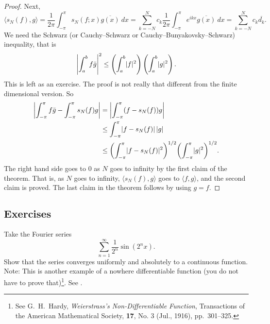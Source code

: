 \begin{proof}
Next,
\begin{equation*}
\langle s_N(f) , g \rangle
=
\frac{1}{2\pi}
\int_{-\pi}^\pi
s_N(f;x) \overline{g(x)} ~ dx
=
\sum_{k=-N}^N
c_k 
\frac{1}{2\pi}
\int_{-\pi}^\pi
e^{ikx}
\overline{g(x)} ~ dx
=
\sum_{k=-N}^N
c_k 
\overline{d_k} .
\end{equation*}
We need the Schwarz (or Cauchy--Schwarz or Cauchy--Bunyakovsky--Schwarz)
inequality, that is
\begin{equation*}
{\left\lvert {\int_a^b f\bar{g}} \right\rvert}^2
\leq
\left( \int_a^b \lvert {f} \rvert^2 \right)
\left( \int_a^b \lvert {g} \rvert^2 \right) .
\end{equation*}
This is left as an exercise.  The proof is not really that
different from the finite dimensional version.
So
\begin{equation*}
\begin{split}
\left\lvert {\int_{-\pi}^\pi f\bar{g} - \int_{-\pi}^\pi s_N(f)g} \right\rvert
& =
\left\lvert {\int_{-\pi}^\pi (f- s_N(f))g} \right\rvert \\
& \leq
\int_{-\pi}^\pi \lvert {f- s_N(f)} \rvert\, \lvert {g} \rvert \\
& \leq
{\left(\int_{-\pi}^\pi \lvert {f- s_N(f)} \rvert^2 \right)}^{1/2}
{\left( \int_{-\pi}^\pi \lvert {g} \rvert^2 \right)}^{1/2} .
\end{split}
\end{equation*}
The right hand side goes to 0 as $N$ goes to infinity by the first
claim of the theorem.
That is, as $N$ goes to infinity, $\langle s_N(f),g \rangle$
goes to $\langle f,g \rangle$, and
the second claim is proved.  The last claim in the theorem follows by using
$g=f$.
\end{proof}

\subsection{Exercises}

\begin{exercise}
Take the Fourier series
\begin{equation*}
\sum_{n=1}^\infty \frac{1}{2^n} \sin(2^n x) .
\end{equation*}
Show that the series converges uniformly and absolutely to a continuous
function.  Note: This is another example of a nowhere differentiable
function (you do not have to prove that)\footnote{%
See
G.\ H.\ Hardy, \emph{Weierstrass's Non-Differentiable Function},
Transactions of the American Mathematical Society,
\textbf{17}, No. 3 (Jul., 1916), pp.\ 301--325.}.
See .
\end{exercise}

